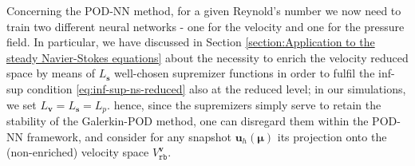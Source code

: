 \documentclass[12pt, a4paper, twoside, openright]{report}
\numberwithin{equation}{chapter}
\theoremstyle{theorem}
\theoremstyle{definition}
\theoremstyle{remark}
\theoremstyle{proposition}
\numberwithin{figure}{chapter}
\newcommand{\bg}[1]{\boldsymbol{#1}}
\begin{document}
		Concerning the POD-NN method, for a given Reynold's number we now need to train two different neural networks - one for the velocity and one for the pressure field. In particular, we have discussed in Section \ref{section:Application to the steady Navier-Stokes equations} about the necessity to enrich the velocity reduced space by means of $L_{\bg{s}}$ well-chosen supremizer functions in order to fulfil the inf-sup condition \eqref{eq:inf-sup-ns-reduced} also at the reduced level; in our simulations, we set $L_{\bg{v}} = L_{\bg{s}} = L_p$. hence, since the supremizers simply serve to retain the stability of the Galerkin-POD method, one can disregard them within the POD-NN framework, and consider for any snapshot $\mathbf{u}_h(\bg{\mu})$ its projection onto the (non-enriched) velocity space $V_{\texttt{rb}}^{\bg{v}}$. 
		
\end{document}
